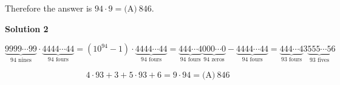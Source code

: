 \begin{enumerate}
 Therefore the answer is $94 \cdot 9 = \boxed{\text{(A)}\ 846.}$




\textbf{Solution 2}


 \[\underbrace{9999\cdots 99}_{94\text{ nines}} \cdot \underbrace{4444\cdots 44}_{94\text{ fours}} = (10^{94}-1)\cdot \underbrace{4444\cdots 44}_{94\text{ fours}} = \underbrace{444\cdots 4}_{94\text{ fours}} \underbrace{000\cdots 0}_{94\text{ zeros}} - \underbrace{4444\cdots 44}_{94\text{ fours}} = \underbrace{444\cdots 4}_{93\text{ fours}} 3 \underbrace{555\cdots 5}_{93\text{ fives}}6\]

 \[4 \cdot 93 + 3 + 5 \cdot 93 + 6 = 9 \cdot 94 = \boxed{\text{(A)}\ 846}\]



\end{enumerate}